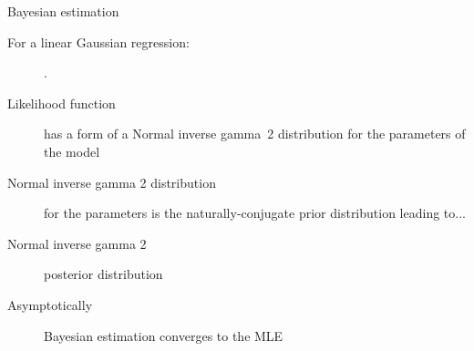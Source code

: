 \documentclass[notes,blackandwhite,mathsans]{beamer}
\begin{document}
{
\begin{frame}{Bayesian estimation}

\begin{description}
\item[{\color{mcxs3}For a linear Gaussian regression:}] {\color{mcxs1}.}

\bigskip\item[{\color{mcxs3}Likelihood function}] {\color{mcxs2}has a form of a Normal inverse gamma~2 distribution for the parameters of the model}

\smallskip\item[{\color{mcxs3}Normal inverse gamma 2 distribution}] {\color{mcxs2}for the parameters is the naturally-conjugate prior distribution leading to...}

\smallskip\item[{\color{mcxs3}Normal inverse gamma 2}] {\color{mcxs2}posterior distribution}

\smallskip\item[{\color{mcxs3}Asymptotically}] {\color{mcxs2}Bayesian estimation converges to the MLE}
\end{description}

\end{frame}
}



%
%
%
\end{document}
